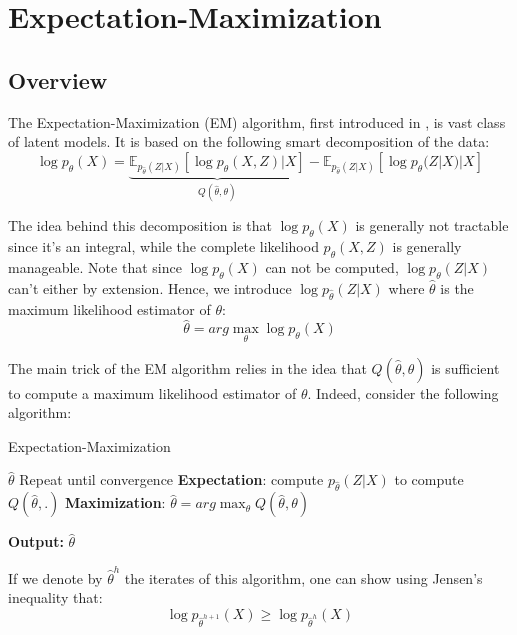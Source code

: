\section{Expectation-Maximization}

\subsection{Overview}

The Expectation-Maximization (EM) algorithm, first introduced in \cite{expectation_maximization_source}, is vast class of latent models.
It is based on the following smart decomposition of the data:
$$
\log p_{\theta}(X) = \underbrace{\mathbb{E}_{p_{\widehat{\theta}}(Z|X)}[\log p_{\theta}(X,Z)|X]}_{Q(\widehat{\theta}, \theta)} - \mathbb{E}_{p_{\widehat{\theta}}(Z|X)}[\log p_{\theta}(Z|X)|X]
$$

The idea behind this decomposition is that $\log p_{\theta}(X)$ is generally not tractable since it's an integral, while the complete likelihood $p_{\theta}(X,Z)$ is generally manageable.
Note that since $\log p_{\theta}(X)$ can not be computed, $\log p_{\theta}(Z|X)$ can't either by extension.
Hence, we introduce $\log p_{\widehat{\theta}}(Z|X)$ where $\widehat{\theta}$ is the maximum likelihood estimator of $\theta$:
$$
\widehat{\theta} = arg\max_{\theta} \log p_{\theta}(X)
$$

The main trick of the EM algorithm relies in the idea that $Q(\widehat{\theta}, \theta)$ is sufficient to compute a maximum likelihood estimator of $\theta$.
Indeed, consider the following algorithm:
\begin{algorithm}[H]
    \caption{Expectation-Maximization}
    \begin{algorithmic}
        \REQUIRE $\widehat{\theta}$
        \STATE Repeat until convergence
            \STATE \quad \textbf{Expectation}: compute $p_{\widehat{\theta}}(Z|X)$ to compute $Q(\widehat{\theta}, .)$
            \STATE \quad \textbf{Maximization}: $\widehat{\theta} = arg\max_{\theta} Q(\widehat{\theta}, \theta)$
    \end{algorithmic}

    \textbf{Output:} $\widehat{\theta}$

    \label{alg:em_algo}
\end{algorithm}

If we denote by $\widehat{\theta}^h$ the iterates of this algorithm, one can show using Jensen's inequality that:
$$
\log p_{\widehat{\theta}^{h+1}}(X) \geq \log p_{\widehat{\theta}^h}(X)
$$

